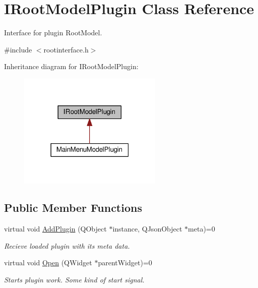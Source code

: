 \hypertarget{class_i_root_model_plugin}{}\section{I\+Root\+Model\+Plugin Class Reference}
\label{class_i_root_model_plugin}


Interface for plugin Root\+Model.  




{\ttfamily \#include $<$rootinterface.\+h$>$}



Inheritance diagram for I\+Root\+Model\+Plugin\+:\nopagebreak
\begin{figure}[H]
\begin{center}
\leavevmode
\includegraphics[width=195pt]{class_i_root_model_plugin__inherit__graph}
\end{center}
\end{figure}
\subsection*{Public Member Functions}
\begin{DoxyCompactItemize}
\item 
virtual void \hyperlink{class_i_root_model_plugin_a6c5a6562b3fc16264d36aa6e39b84a7f}{Add\+Plugin} (Q\+Object $\ast$instance, Q\+Json\+Object $\ast$meta)=0
\begin{DoxyCompactList}\small\item\em Recieve loaded plugin with it\textquotesingle{}s meta data. \end{DoxyCompactList}\item 
virtual void \hyperlink{class_i_root_model_plugin_a9ee55034608480fda71b7700d3495984}{Open} (Q\+Widget $\ast$parent\+Widget)=0
\begin{DoxyCompactList}\small\item\em Starts plugin work. Some kind of \textquotesingle{}start\textquotesingle{} signal. \end{DoxyCompactList}\end{DoxyCompactItemize}


